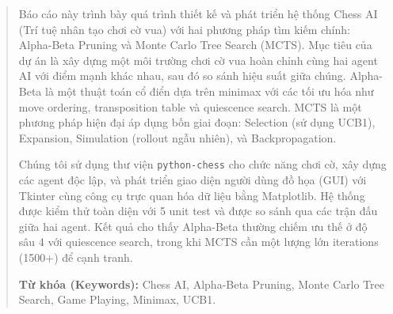 \begin{abstract}
Báo cáo này trình bày quá trình thiết kế và phát triển hệ thống Chess AI (Trí tuệ nhân tạo chơi cờ vua) với hai phương pháp tìm kiếm chính: Alpha-Beta Pruning và Monte Carlo Tree Search (MCTS). Mục tiêu của dự án là xây dựng một môi trường chơi cờ vua hoàn chỉnh cùng hai agent AI với điểm mạnh khác nhau, sau đó so sánh hiệu suất giữa chúng. Alpha-Beta là một thuật toán cổ điển dựa trên minimax với các tối ưu hóa như move ordering, transposition table và quiescence search. MCTS là một phương pháp hiện đại áp dụng bốn giai đoạn: Selection (sử dụng UCB1), Expansion, Simulation (rollout ngẫu nhiên), và Backpropagation.

Chúng tôi sử dụng thư viện \texttt{python-chess} cho chức năng chơi cờ, xây dựng các agent độc lập, và phát triển giao diện người dùng đồ họa (GUI) với Tkinter cùng công cụ trực quan hóa dữ liệu bằng Matplotlib. Hệ thống được kiểm thử toàn diện với 5 unit test và được so sánh qua các trận đấu giữa hai agent. Kết quả cho thấy Alpha-Beta thường chiếm ưu thế ở độ sâu 4 với quiescence search, trong khi MCTS cần một lượng lớn iterations (1500+) để cạnh tranh.

\textbf{Từ khóa (Keywords):} Chess AI, Alpha-Beta Pruning, Monte Carlo Tree Search, Game Playing, Minimax, UCB1.
\end{abstract}

